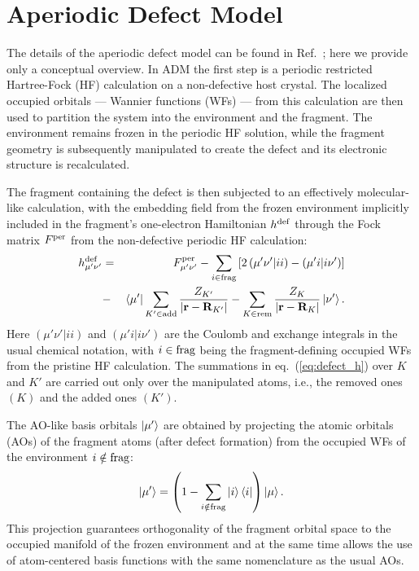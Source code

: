 \documentclass[aip,jcp,reprint]{revtex4-2}
\begin{document}

\section{Aperiodic Defect Model}


The details of the aperiodic defect model can be found in Ref.~; here we provide only a conceptual overview. In ADM the first step is a periodic restricted Hartree-Fock (HF) calculation on a non-defective host crystal. The localized occupied orbitals --- Wannier functions (WFs) --- from this calculation\cite{Zicovich_Dovesi_WFs} are then used to partition the system into the environment and the fragment. The environment remains frozen in the periodic HF solution, while the fragment geometry is subsequently manipulated to create the defect and its electronic structure is recalculated.

The fragment containing the defect is then subjected to an effectively molecular-like calculation, with the embedding field from the frozen environment implicitly included in the fragment's one-electron Hamiltonian $h^{\rm def}$ through the Fock matrix $F^{\rm per}$ from the non-defective periodic HF calculation:
\begin{eqnarray}
h^{\rm def}_{\mu'\nu'}&=&F^{\rm per}_{\mu'\nu'}-\sum_{i\in{\rm frag}}\left[2\left(\mu'\nu'|ii\right)
  - \left(\mu' i|i \nu'\right)\right]\\
&-& \bra{\mu'} \sum_{K'\in{\rm add}}{Z_{K'} \over |{\bf r}-{\bf
    R}_{K'}|}-\sum_{K\in{\rm rem}}{Z_{K} \over |{\bf r}-{\bf
                          R}_{K}|}\ket{\nu'}.\label{eq:defect_h}
\end{eqnarray}
Here $(\mu'\nu'|ii)$ and $(\mu' i|i \nu')$ are the Coulomb and exchange integrals in the usual chemical notation, with $i\in{\rm frag}$ being the fragment-defining occupied WFs from the pristine HF calculation. The summations in eq.~(\ref{eq:defect_h}) over $K$ and $K'$ are carried out only over the manipulated atoms, i.e., the removed ones $(K)$ and the added ones $(K')$.


The AO-like basis orbitals $\ket{\mu'}$ are obtained by projecting the atomic orbitals (AOs) of the fragment atoms (after defect formation) from the occupied WFs of the environment $i\notin{\rm frag}$:
\begin{eqnarray}
  \left|\mu'\right>=\left(1-\sum_{i\notin{\rm frag}}\left|i\right>\left<i\right|
  \right)\left|\mu\right>.\label{eq:new_AO}
\end{eqnarray}
This projection guarantees orthogonality of the fragment orbital space to the occupied manifold of the frozen environment and at the same time allows the use of atom-centered basis functions with the same nomenclature as the usual AOs.
\end{document}
